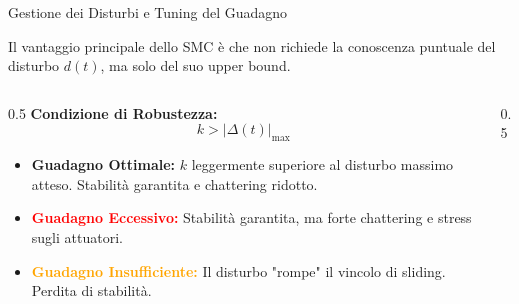 \documentclass[aspectratio=169]{beamer} %
\begin{document}
\begin{frame}{Gestione dei Disturbi e Tuning del Guadagno}
    
    Il vantaggio principale dello SMC è che non richiede la conoscenza puntuale del disturbo $d(t)$, ma solo del suo upper bound.
    
    \begin{columns}[c]
        \begin{column}{0.5\textwidth}
            \textbf{Condizione di Robustezza:}
            $$ k > |\Delta(t)|_{\max} $$
            
            \vspace{0.2cm}
            \small
            \begin{itemize}
                \item \textcolor{green!60!black}{\textbf{Guadagno Ottimale:}} $k$ leggermente superiore al disturbo massimo atteso. Stabilità garantita e chattering ridotto.
                \item \textcolor{red}{\textbf{Guadagno Eccessivo:}} Stabilità garantita, ma forte chattering e stress sugli attuatori.
                \item \textcolor{orange}{\textbf{Guadagno Insufficiente:}} Il disturbo "rompe" il vincolo di sliding. Perdita di stabilità.
            \end{itemize}
        \end{column}
        
        \begin{column}{0.5\textwidth}
            \centering
\end{column}
\end{columns}
\end{frame}
\end{document}
